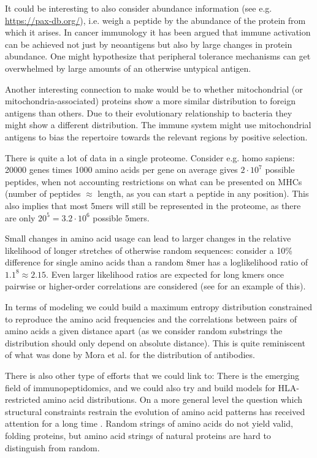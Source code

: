 \documentclass[superscriptaddress,onecolumn,pre]{revtex4}
\newcommand{\<}{\langle}
\renewcommand{\>}{\rangle}
\begin{document}
It could be interesting to also consider abundance information (see e.g. \url{https://pax-db.org/}), i.e. weigh a peptide by the abundance of the protein from which it arises. In cancer immunology \cite{Walz2015} it has been argued that immune activation can be achieved not just by neoantigens but also by large changes in protein abundance. One might hypothesize that peripheral tolerance mechanisms can get overwhelmed by large amounts of an otherwise untypical antigen.

Another interesting connection to make would be to whether mitochondrial (or mitochondria-associated) proteins show a more similar distribution to foreign antigens than others. Due to their evolutionary relationship to bacteria they might show a different distribution. The immune system might use mitochondrial antigens to bias the repertoire towards the relevant regions by positive selection.

There is quite a lot of data in a single proteome. Consider e.g. homo sapiens: 20000 genes times 1000 amino acids per gene on average gives $2 \cdot 10^7$ possible peptides, when not accounting restrictions on what can be presented on MHCs (number of peptides $\approx$ length, as you can start a peptide in any position). This also implies that most 5mers will still be represented in the proteome, as there are only $20^5 = 3.2 \cdot 10^6$ possible 5mers.

Small changes in amino acid usage can lead to larger changes in the relative likelihood of longer stretches of otherwise random sequences: consider a 10\% difference for single amino acids than a random 8mer has a loglikelihood ratio of $1.1^8 \approx 2.15$. Even larger likelihood ratios are expected for long kmers once pairwise or higher-order correlations are considered (see \cite{Schneidman2006} for an example of this).

In terms of modeling we could build a maximum entropy distribution constrained to reproduce the amino acid frequencies and the correlations between pairs of amino acids a given distance apart (as we consider random substrings the distribution should only depend on absolute distance). This is quite reminiscent of what was done by Mora et al. \cite{Mora2010} for the distribution of antibodies.

There is also other type of efforts that we could link to: There is the emerging field of immunopeptidomics, and we could also try and build models for HLA-restricted amino acid distributions.
On a more general level the question which structural constraints restrain the evolution of amino acid patterns has received attention for a long time \cite{Turjanski2018}. Random strings of amino acids do not yield valid, folding proteins, but amino acid strings of natural proteins are hard to distinguish from random.
\end{document}
